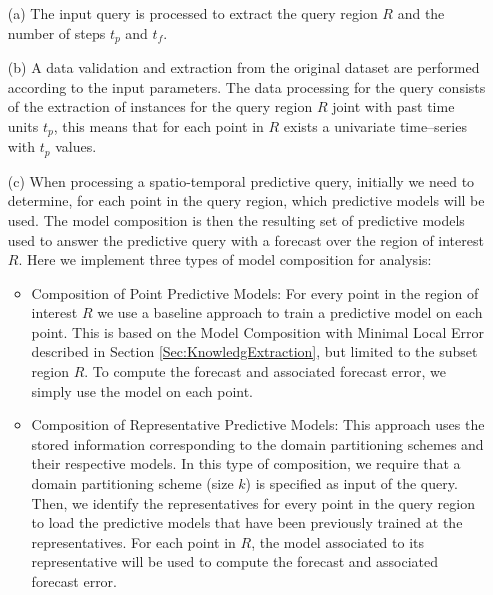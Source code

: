 \begin{itemize}
    \item [(a)] The input query is processed to extract the query region $R$ and the number of steps $t_p$ and $t_f$.
    \item [(b)] A data validation and extraction from the original dataset are performed according to the input parameters. The data processing for the query consists of the extraction of instances for the query region $R$ joint with past time units $t_{p}$, this means that for each point in $R$ exists a univariate time--series with $t_{p}$ values.
    \item [(c)] When processing a spatio-temporal predictive query, initially we need to determine, for each point in the query region, which predictive models will be used. The model composition is then the resulting set of predictive models used to answer the predictive query with a forecast over the region of interest $R$. %
    Here we implement three types of model composition for analysis:

   \begin{itemize}
	\item Composition of Point Predictive Models: For every point in the region of interest $R$ we use a baseline approach to train a predictive model on each point. This is based on the Model Composition with Minimal Local Error described in Section \ref{Sec:KnowledgExtraction}, but limited to the subset region $R$. To compute the forecast and associated forecast error, we simply use the model on each point.

	\item Composition of Representative Predictive Models: This approach uses the stored information corresponding to the domain partitioning schemes and their respective models. In this type of composition, we require that a domain partitioning scheme (size $k$) is specified as input of the query. Then, we identify the representatives for every point in the query region to load the predictive models that have been previously trained at the representatives. For each point in $R$, the model associated to its representative will be used to compute the forecast and associated forecast error.
	

\end{itemize}
\end{itemize}
